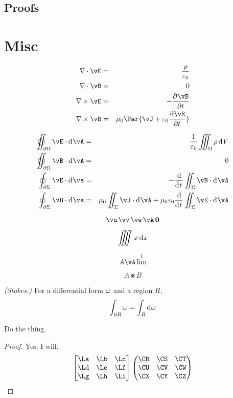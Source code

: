 \documentclass[11pt]{article}
\begin{document}



\subsection{Proofs}

\resetQED


\section*{Misc}

\usevec

\begin{eqnarray*}
    \Dive\vE &=& \frac{\rho}{\ep_0} \\
    \Dive\vB &=& 0 \\
    \Curl\vE &=& -\pd{\vB}{t} \\
    \Curl\vB &=& \mu_0\Par{\vJ + \ep_0\pd{\vE}{t}}
\end{eqnarray*}

\useveca

\begin{eqnarray*}
    \varoiint_{\del\Om} \vE\cdot\D\vA &=& \frac{1}{\ep_0} \iiint_\Om \rho\D V \\
    \varoiint_{\del\Om} \vB\cdot\D\vA &=& 0 \\
    \oint_{\del\Si} \vE\cdot\D \vs &=& -\od{}{t}\iint_\Si \vB\cdot\D\vA \\
    \oint_{\del\Si} \vB\cdot\D \vs &=& 
        \mu_0\iint_\Si\vJ\cdot\D\vA + \mu_0\ep_0\od{}{t}\iint_\Si\vE\cdot\D\vA 
\end{eqnarray*}

\[ \vu\,\vv\,\vw\,\vk\,\vzero \]

\[ \iiiint x \D x\]

\[ A\vA\lim^1 \]

\[ A \smashtimes B \]

\begin{thm*} {\em (Stokes.)}
    For a differential form $\omega$ and a region $R$, 
    \[ \int_{\del R}\om = \int_R \D \om \]
\end{thm*}


\begin{psetProblem}
    Do the thing.
    \begin{proof}
        Yes, I will.
        \[ 
            \bthree{\La}{\Lb}{\Lc}{\Ld}{\Le}{\Lf}{\Lg}{\Lh}{\Li}
            \pthree{\CR}{\CS}{\CT}{\CU}{\CV}{\CW}{\CX}{\CY}{\CZ} 
        \]
    \end{proof}
\end{psetProblem}
\end{document}
